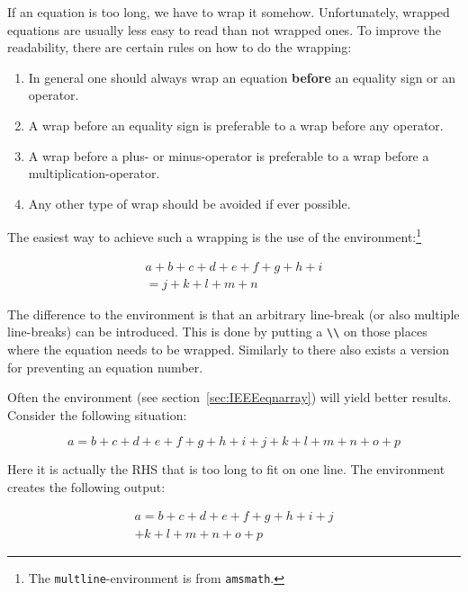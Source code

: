 If an equation is too long, we have to wrap it somehow. Unfortunately,
wrapped equations are usually less easy to read than not wrapped
ones. To improve the readability, there are certain rules on how to do
the wrapping:
\begin{enumerate}
\item In general one should always wrap an equation \textbf{before} an
  equality sign or an operator.
\item A wrap before an equality sign is preferable to a wrap before
  any operator.
\item A wrap before a plus- or minus-operator is preferable to a wrap
  before a multiplication-operator.
\item Any other type of wrap should be avoided if ever possible.
\end{enumerate}
The easiest way to achieve such a wrapping is the use of the
 en\-vi\-ron\-ment:\footnote{The
  \texttt{multline}-environment is from \texttt{amsmath}.}
\begin{example}
\begin{multline}
  a + b + c + d + e + f 
  + g + h + i  
  \\
  = j + k + l + m + n 
\end{multline}
\end{example}
\noindent
The difference to the  environment is that an arbitrary
line-break (or also multiple line-breaks) can be introduced. This is
done by putting a \verb+\\+ on those places where the equation needs
to be wrapped. Similarly to  there also exists a
 version for preventing an equation number.

Often the
 environment (see section~\ref{sec:IEEEeqnarray})
will yield better results.  Consider the following
situation:
\begin{example}
\begin{equation}
  a = b + c + d + e + f 
  + g + h + i + j 
  + k + l + m + n + o + p  
  \label{eq:equation_too_long}
\end{equation}
\end{example}
\noindent
Here it is actually the RHS that is too long to fit on one line. The
 environment creates the following output:
\begin{example}
\begin{multline}
  a = b + c + d + e + f 
  + g + h + i + j \\
  + k + l + m + n + o + p
\end{multline}
\end{example}

